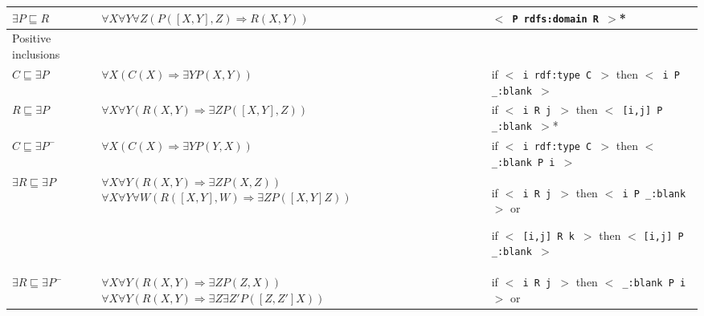 \documentclass[]{article}
\begin{document}
\begin{longtable}{| p{3.7cm} | p{7cm} | p{5.2cm} |}
	\hline
		\cellcolor[gray]{0.7} $\exists P \sqsubseteq R$
		&
		\cellcolor[gray]{0.7} $\forall X \forall Y \forall Z (P([X,Y],Z) \Rightarrow R(X,Y))$
		&
		\cellcolor[gray]{0.7} $<$\texttt{ P rdfs:domain R }$>$*
	\\

	\hline
		Positive inclusions & &
	\\
	
	\hline
		$C \sqsubseteq \exists P$		
		&
		$\forall X(C(X) \Rightarrow \exists Y P(X,Y)) $
		&
		if $<$\texttt{ i rdf:type C }$>$ \newline
		then $<$\texttt{ i P \_:blank }$>$
	\\
	
	\hline	
		\cellcolor[gray]{0.7} $R \sqsubseteq \exists P$		
		&
		\cellcolor[gray]{0.7} $\forall X \forall Y (R(X,Y) \Rightarrow \exists Z P([X,Y],Z)) $
		&
		\cellcolor[gray]{0.7} if $<$\texttt{ i R j }$>$ \newline
		then $<$\texttt{ [i,j] P \_:blank }$>$*
	\\
	
	\hline
		$C \sqsubseteq \exists P^{-}$		
		&
		$\forall X (C(X) \Rightarrow \exists Y P(Y,X)) $
		&
		if $<$\texttt{ i rdf:type C }$>$ \newline
		then $<$\texttt{ \_:blank P i }$>$
	\\
	
	\hline
		\cellcolor[gray]{0.9} $\exists R \sqsubseteq \exists P$		
		&
		\cellcolor[gray]{0.9} $\forall X \forall Y (R(X,Y) \Rightarrow \exists Z P(X,Z)) $ \newline
		$\forall X \forall Y \forall W(R([X,Y],W) \Rightarrow \exists Z P([X,Y]Z)) $
		&
		\cellcolor[gray]{0.9} if $<$\texttt{ i R j }$>$ \newline
		then $<$\texttt{ i P \_:blank }$>$ or \newline
		
		\cellcolor[gray]{0.9} if $<$\texttt{ [i,j] R k }$>$ \newline
		then $<$ \texttt{[i,j] P \_:blank }$>$
	\\
	
	\hline	
		\cellcolor[gray]{0.9} $\exists R \sqsubseteq \exists P^{-}$		
		&
		\cellcolor[gray]{0.9} $\forall X \forall Y (R(X,Y) \Rightarrow \exists Z P(Z,X)) $ \newline
		$\forall X \forall Y (R(X,Y) \Rightarrow \exists Z \exists Z\prime P([Z,Z\prime]X)) $
		&
		\cellcolor[gray]{0.9} if $<$\texttt{ i R j }$>$ \newline
		then $<$\texttt{ \_:blank P i }$>$ or \newline
		

\end{longtable}
\end{document}

